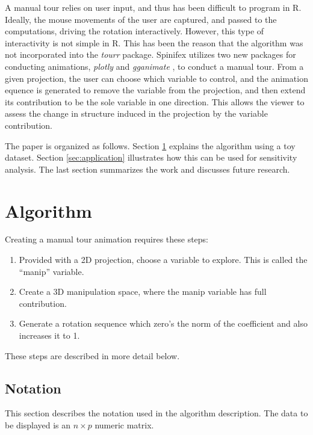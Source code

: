 \documentclass{monashthesis}
\begin{document}
A manual tour relies on user input, and thus has been difficult to program in R. Ideally, the mouse movements of the user are captured, and passed to the computations, driving the rotation interactively. However, this type of interactivity is not simple in R. This has been the reason that the algorithm was not incorporated into the \emph{tourr} package. Spinifex utilizes two new packages for conducting animations, \emph{plotly} \autocite{sievert_plotly_2018} and \emph{gganimate} \autocite{pedersen_gganimate:_2019}, to conduct a manual tour. From a given projection, the user can choose which variable to control, and the animation equence is generated to remove the variable from the projection, and then extend its contribution to be the sole variable in one direction. This allows the viewer to assess the change in structure induced in the projection by the variable contribution.

The paper is organized as follows. Section \ref{sec:algorithm} explains the algorithm using a toy dataset. Section \ref{sec:application} illustrates how this can be used for sensitivity analysis. The last section summarizes the work and discusses future research.

\hypertarget{sec:algorithm}{%
\section{Algorithm}\label{sec:algorithm}}

Creating a manual tour animation requires these steps:

\begin{enumerate}
\def\labelenumi{\arabic{enumi}.}
\tightlist
\item
  Provided with a 2D projection, choose a variable to explore. This is called the ``manip'' variable.
\item
  Create a 3D manipulation space, where the manip variable has full contribution.
\item
  Generate a rotation sequence which zero's the norm of the coefficient and also increases it to 1.
\end{enumerate}

These steps are described in more detail below.

\hypertarget{notation}{%
\subsection{Notation}\label{notation}}

This section describes the notation used in the algorithm description. The data to be displayed is an \(n \times p\) numeric matrix.
\end{document}
